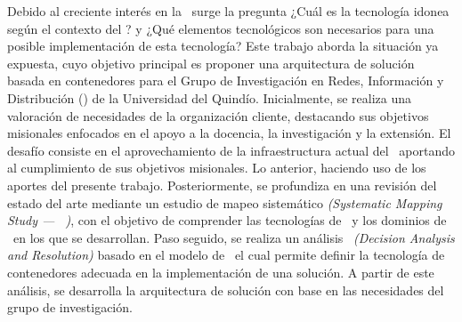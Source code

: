 Debido al creciente interés en la \VBC\ surge la pregunta ¿Cuál es la tecnología idonea según el contexto del \GRID? y ¿Qué elementos tecnológicos son necesarios para una posible implementación de esta tecnología?  Este trabajo aborda la situación ya expuesta, cuyo objetivo principal es proponer una arquitectura de solución basada en contenedores para el Grupo de Investigación en Redes, Información y Distribución (\GRID) de la Universidad del Quindío. Inicialmente, se realiza una valoración de necesidades de la organización cliente, destacando sus objetivos misionales enfocados en el apoyo a la docencia, la investigación y la extensión. El desafío consiste en el aprovechamiento de la infraestructura actual del \GRID\ aportando al cumplimiento de sus objetivos misionales. Lo anterior, haciendo uso de los aportes del presente trabajo. Posteriormente, se profundiza en una revisión del estado del arte mediante un estudio de mapeo sistemático \textit{(Systematic Mapping Study --- \SMS\ )}, con el objetivo de comprender las tecnologías de \VBC\ y los dominios de \TI\ en los que se desarrollan. Paso seguido, se realiza un análisis \DAR\ \textit{(Decision Analysis and Resolution)} basado en el modelo de \CMMI\, el cual permite definir la tecnología de contenedores adecuada
en la implementación de una solución. A partir de este análisis, se desarrolla la arquitectura de solución con base en las necesidades del grupo de investigación.
